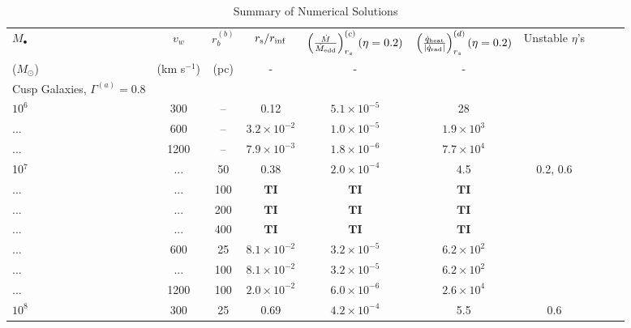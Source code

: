 \documentclass[usenatbib,fleqn]{mn2e}
\begin{document}
\begin{table}
\begin{threeparttable}
\begin{minipage}{18cm}
  \caption{Summary of Numerical Solutions}
\begin{tabular}{lccccccccc}
  \hline
  {$M_{\bullet}$} & {$v_{w}$} & {$r_b^{(b)}$} &   $r_{\rm s}/r_{\rm
    inf}$ &  {$\left(\frac{\dot{M}}{\dot{M}_{\rm edd}}\right)_{r_{s}}^{(c)}
      (\eta=0.2)$} & {$\left(\frac{\dot{q}_{\rm heat}}{|\dot{q}_{\rm
            rad}|}\right)_{r_s}^{(d)} (\eta=0.2)$} & Unstable $\eta$'s  \\
    ($M_{\odot}$) & (km s$^{-1}$) & (pc) &- & - & - &  & \\ 
    \hline
    Cusp Galaxies, $\Gamma^{(a)} = 0.8$ & & & & & & & & \\
    $    10^{ 6 }$ & 300 & -- & 0.12 & $ 5.1 \times 10^{ -5 }$ & 28 \\
    ... & 600 & -- & $ 3.2 \times 10^{ -2 }$ & $ 1.0 \times 10^{ -5 }$ & $ 1.9 \times 10^{ 3 }$ \\
    ... & 1200 & -- & $ 7.9 \times 10^{ -3 }$ & $ 1.8 \times 10^{ -6 }$ & $ 7.7 \times 10^{ 4 }$ \\
   10$^{7}$ & ... & 50 & 0.38 & $ 2.0 \times 10^{ -4 }$ & 4.5 & 0.2, 0.6\\
... & ... & 100 & $\mathbf{TI}$ & $\mathbf{TI}$ & $\mathbf{TI}$ \\
... & ... & 200 & $\mathbf{TI}$ & $\mathbf{TI}$ & $\mathbf{TI}$ \\
... & ... & 400 & $\mathbf{TI}$ & $\mathbf{TI}$ & $\mathbf{TI}$ \\
... & 600 & 25 & $ 8.1 \times 10^{ -2 }$ & $ 3.2 \times 10^{ -5 }$ & $ 6.2 \times 10^{ 2 }$ \\
... & ... & 100 & $ 8.1 \times 10^{ -2 }$ & $ 3.2 \times 10^{ -5 }$ & $ 6.2 \times 10^{ 2 }$ \\
... & 1200 & 100 & $ 2.0 \times 10^{ -2 }$ & $ 6.0 \times 10^{ -6 }$ & $ 2.6 \times 10^{ 4 }$ \\
$    10^{ 8 }$ & 300 & 25 & 0.69 & $ 4.2 \times 10^{ -4 }$ & 5.5 & 0.6\\

\end{tabular}
\end{minipage}
\end{threeparttable}
\end{table}
\end{document}
